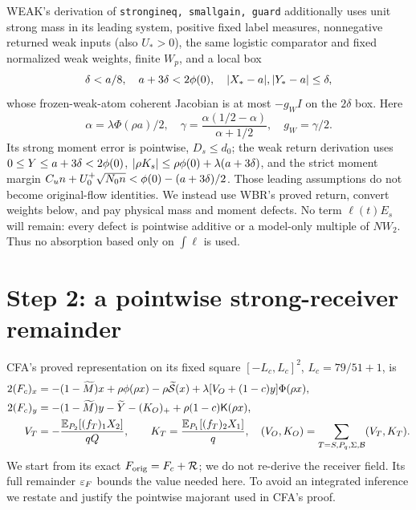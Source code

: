 \documentclass[11pt]{article}
\numberwithin{equation}{section}
\theoremstyle{remark}\newtheorem{remark}[theorem]{Remark}
\newcommand{\Kfun}{\mathsf K}\newcommand{\Ffun}{\mathsf F}
\begin{document}
WEAK's derivation of \texttt{strongineq, smallgain, guard} additionally
uses unit strong mass in its leading system, positive fixed label
measures, nonnegative returned weak inputs (also $U_*>0$), the
same logistic comparator and fixed normalized weak weights, finite
$W_p$, and a local box
\[
 \delta<a/8,\quad a+3\delta<2\phi(0),\quad
 |X_*-a|,|Y_*-a|\le\delta,
\]
whose frozen-weak-atom coherent Jacobian is at most $-g_WI$ on
the $2\delta$ box. Here
\[
 \alpha=\lambda\Phi(\rho a)/2,\quad
 \gamma=\frac{\alpha(1/2-\alpha)}{\alpha+1/2},\quad g_W=\gamma/2.
\]
Its strong moment error is pointwise, $D_s\le d_0$; the weak
return derivation uses $0\le Y\le a+3\delta<2\phi(0)$,
$|\rho K_s|\le\rho\phi(0)+\lambda(a+3\delta)$, and the strict
moment margin $C_un+U_0^+\sqrt{N_0n}<\phi(0)-(a+3\delta)/2$.
Those leading assumptions do not become original-flow identities.
We instead use WBR's proved return, convert weights below, and
pay physical mass and moment defects. No term $\ell(t)E_s$ will
remain: every defect is pointwise additive or a model-only multiple
of $NW_2$. Thus no absorption based only on $\int\ell$ is used.

\section{Step 2: a pointwise strong-receiver remainder}
\label{an03srrv1:fieldsection}
CFA's proved representation on its fixed square
$[-L_c,L_c]^2$, $L_c=79/51+1$, is
\begin{align}
 2(F_c)_x&=-(1-\widetilde M)x+\rho\phi(\rho x)
 -\rho\widetilde{\mathcal S}(x)
 +\lambda[V_O+(1-c)y]\Phi(\rho x),\notag\\
 2(F_c)_y&=-(1-\widetilde M)y-\widetilde Y-(K_O)_+
                         +\rho(1-c)\Kfun(\rho x),
 \label{an03srrv1:cform}\\
 V_T&=-\frac{\E_{P_2}[(f_T)_1X_2]}{qQ},\qquad
 K_T=\frac{\E_{P_1}[(f_T)_2X_1]}q,
 \quad (V_O,K_O)=\sum_{T=S,P_q,\Sigma,\BB}(V_T,K_T).
 \label{an03srrv1:moments}
\end{align}
We start from its exact $F_{\rm orig}=F_c+\mathcal R$;
we do not re-derive the receiver field. Its full remainder
$\varepsilon_F$ bounds the value needed here. To avoid an integrated
inference we restate and justify the pointwise majorant used in
CFA's proof.
\end{document}

